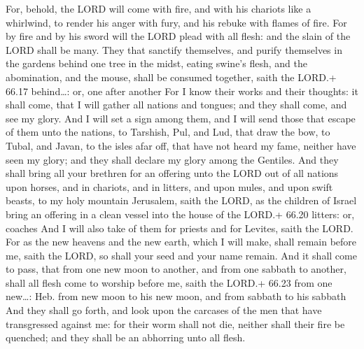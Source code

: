  For, behold, the LORD will come with fire, and with his
chariots like a whirlwind, to render his anger with fury, and his rebuke
with flames of fire.  For by fire and by his sword will
the LORD plead with all flesh: and the slain of the LORD shall be many.
 They that sanctify themselves, and purify themselves in
the gardens behind one tree in the midst, eating swine's flesh, and the
abomination, and the mouse, shall be consumed together, saith the LORD.+
66.17 behind\ldots: or, one after another  For I know
their works and their thoughts: it shall come, that I will gather all
nations and tongues; and they shall come, and see my glory.
 And I will set a sign among them, and I will send those
that escape of them unto the nations, to Tarshish, Pul, and Lud, that
draw the bow, to Tubal, and Javan, to the isles afar off, that have not
heard my fame, neither have seen my glory; and they shall declare my
glory among the Gentiles.  And they shall bring all your
brethren for an offering unto the LORD out of all nations upon horses,
and in chariots, and in litters, and upon mules, and upon swift beasts,
to my holy mountain Jerusalem, saith the LORD, as the children of Israel
bring an offering in a clean vessel into the house of the LORD.+ 66.20
litters: or, coaches  And I will also take of them for
priests and for Levites, saith the LORD.  For as the new
heavens and the new earth, which I will make, shall remain before me,
saith the LORD, so shall your seed and your name remain. 
And it shall come to pass, that from one new moon to another, and from
one sabbath to another, shall all flesh come to worship before me, saith
the LORD.+ 66.23 from one new\ldots: Heb. from new moon to his new moon,
and from sabbath to his sabbath  And they shall go forth,
and look upon the carcases of the men that have transgressed against me:
for their worm shall not die, neither shall their fire be quenched; and
they shall be an abhorring unto all flesh.
